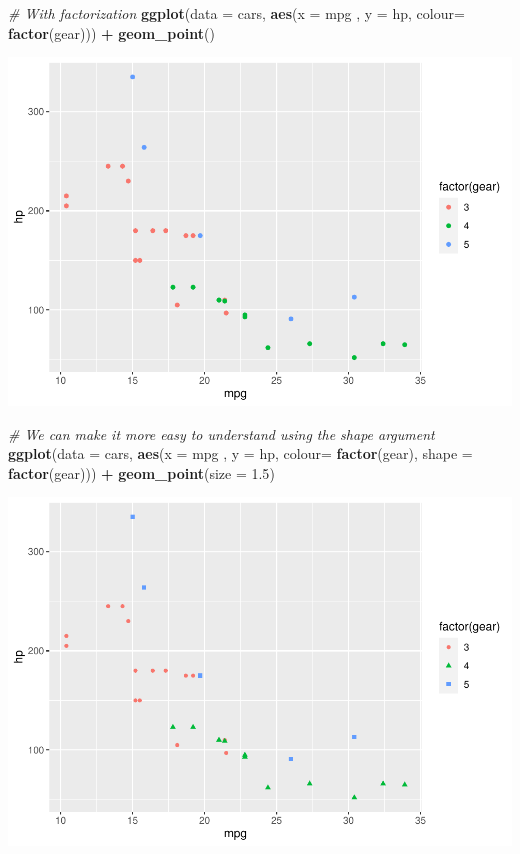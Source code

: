 \documentclass[]{article}
\newenvironment{Shaded}{\begin{snugshade}}{\end{snugshade}}
\newcommand{\CommentTok}[1]{\textcolor[rgb]{0.56,0.35,0.01}{\textit{#1}}}
\newcommand{\DataTypeTok}[1]{\textcolor[rgb]{0.13,0.29,0.53}{#1}}
\newcommand{\FloatTok}[1]{\textcolor[rgb]{0.00,0.00,0.81}{#1}}
\newcommand{\KeywordTok}[1]{\textcolor[rgb]{0.13,0.29,0.53}{\textbf{#1}}}
\newcommand{\NormalTok}[1]{#1}
\newcommand{\OperatorTok}[1]{\textcolor[rgb]{0.81,0.36,0.00}{\textbf{#1}}}
\newcommand{\StringTok}[1]{\textcolor[rgb]{0.31,0.60,0.02}{#1}}
\begin{document}
\begin{Shaded}
\begin{Highlighting}[]
\CommentTok{# With factorization}
\KeywordTok{ggplot}\NormalTok{(}\DataTypeTok{data =}\NormalTok{ cars, }\KeywordTok{aes}\NormalTok{(}\DataTypeTok{x =}\NormalTok{ mpg , }\DataTypeTok{y =}\NormalTok{ hp, }\DataTypeTok{colour=} \KeywordTok{factor}\NormalTok{(gear))) }\OperatorTok{+}\StringTok{ }
\StringTok{          }\KeywordTok{geom_point}\NormalTok{()}
\end{Highlighting}
\end{Shaded}

\includegraphics{Day_5_files/figure-latex/unnamed-chunk-14-2.pdf}

\begin{Shaded}
\begin{Highlighting}[]
\CommentTok{# We can make it more easy to understand using the shape argument}
\KeywordTok{ggplot}\NormalTok{(}\DataTypeTok{data =}\NormalTok{ cars, }\KeywordTok{aes}\NormalTok{(}\DataTypeTok{x =}\NormalTok{ mpg , }\DataTypeTok{y =}\NormalTok{ hp, }
                        \DataTypeTok{colour=} \KeywordTok{factor}\NormalTok{(gear), }
                        \DataTypeTok{shape =} \KeywordTok{factor}\NormalTok{(gear))) }\OperatorTok{+}\StringTok{ }
\StringTok{          }\KeywordTok{geom_point}\NormalTok{(}\DataTypeTok{size =} \FloatTok{1.5}\NormalTok{)}
\end{Highlighting}
\end{Shaded}

\includegraphics{Day_5_files/figure-latex/unnamed-chunk-14-3.pdf}
\end{document}
